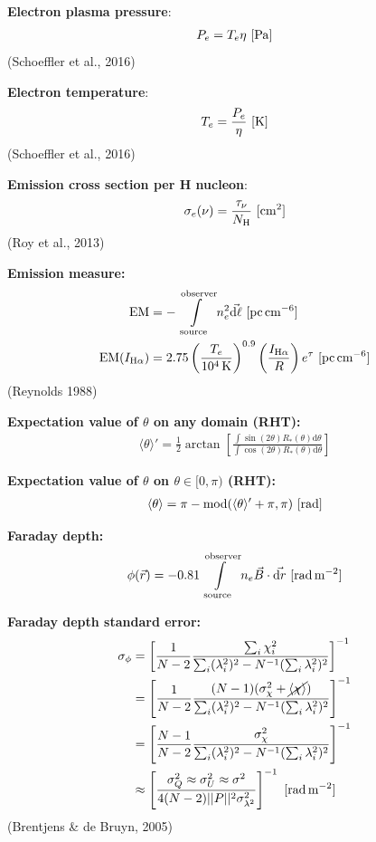 \documentclass[a4paper,10pt]{article}
\begin{document}
{\noindent}\textbf{Electron plasma pressure}:
\begin{align*}
    P_e = T_e \eta ~ [{\rm Pa}]
\end{align*}
(Schoeffler et al., 2016)

{\noindent}\textbf{Electron temperature}:
\begin{align*}
    T_e = \frac{P_e}{\eta} ~ [{\rm K}]
\end{align*}
(Schoeffler et al., 2016)

{\noindent}\textbf{Emission cross section per H nucleon}:
\begin{align*}
    \sigma_e(\nu) = \frac{\tau_\nu}{N_{\rm H}} ~ [{\rm cm^2}]
\end{align*}
(Roy et al., 2013)

{\noindent}\textbf{Emission measure:}
\begin{align*}
    {\rm EM} &= -\int\limits_\mathrm{source}^\mathrm{observer} n_e^2\vec{{\rm d}\ell} ~ [{\rm pc\,cm^{-6}}] \\
    {\rm EM}(I_{\rm H\alpha}) &= 2.75 \left(\frac{T_e}{10^4\,{\rm K}}\right)^{0.9} \left(\frac{I_{\rm H\alpha}}{R}\right) e^\tau ~ [{\rm pc\,cm^{-6}}]
\end{align*}
(Reynolds 1988)

{\noindent}\textbf{Expectation value of $\theta$ on any domain (RHT):}
\begin{align*}
    \langle\theta\rangle' = \frac{1}{2}\arctan \left[\frac{\int\sin(2\theta)R_*(\theta)\mathrm{d}\theta}{\int\cos(2\theta)R_*(\theta)\mathrm{d}\theta}\right]
\end{align*}

{\noindent}\textbf{Expectation value of $\theta$ on $\theta\in[0,\pi)$ (RHT):}
\begin{align*}
    \langle\theta\rangle = \pi - {\rm mod}(\langle\theta\rangle'+\pi,\pi) ~ [{\rm rad}]
\end{align*}

{\noindent}\textbf{Faraday depth:} 
\begin{align*}
    \phi(\vec{r}) = -0.81 \int\limits_\mathrm{source}^\mathrm{observer}n_e\vec{B}\cdot\vec{{\rm d}r} ~ [{\rm rad\,m^{-2}}]
\end{align*}

{\noindent}\textbf{Faraday depth standard error:}
\begin{align*}
\sigma_\phi &= \left[ \dfrac{1}{N-2} \dfrac{\sum_i\chi_i^2}{\sum_i(\lambda_i^2)^2 - N^{-1}(\sum_i\lambda_i^2)^2} \right]^{-1} \\
&= \left[ \dfrac{1}{N-2} \dfrac{(N-1)(\sigma_\chi^2 + \cancel{\langle\chi\rangle})}{\sum_i(\lambda_i^2)^2 - N^{-1}(\sum_i\lambda_i^2)^2} \right]^{-1} \\
&= \left[ \dfrac{N-1}{N-2} \dfrac{\sigma_\chi^2}{\sum_i(\lambda_i^2)^2 - N^{-1}(\sum_i\lambda_i^2)^2} \right]^{-1} \\
&\approx \left[ \dfrac{\sigma_Q^2\approx\sigma_U^2\approx\sigma^2}{4(N-2)\lvert\lvert P \rvert\rvert^2\sigma_{\lambda^2}^2} \right]^{-1} ~ [{\rm rad\,m^{-2}}]
\end{align*}
(Brentjens \& de Bruyn, 2005)
\end{document}
